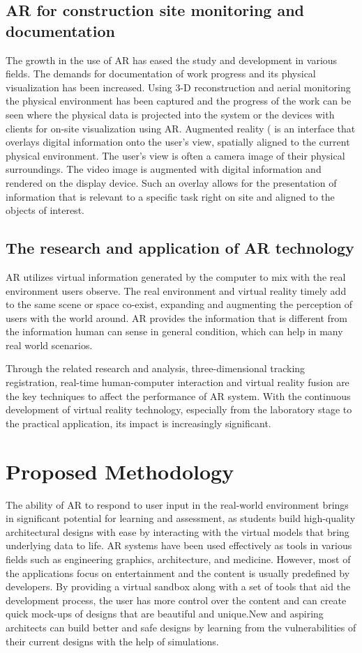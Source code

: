\documentclass[conference]{IEEEtran}
\begin{document}
\subsection{AR for construction site monitoring and documentation}
The growth in the use of AR has eased the study and development in various fields. The demands for documentation of work progress and its physical visualization has been increased. Using 3-D reconstruction and aerial monitoring the physical environment has been captured and the progress of the work can be seen where the physical data is projected into the system or the devices with clients for on-site visualization using AR\cite{sitemonitoring}. Augmented reality ( is an interface that overlays digital information onto the user's view, spatially aligned to the current physical environment. The user's view is often a camera image of their physical surroundings. The video image is augmented with digital information and rendered on the display device. Such an overlay allows for the presentation of information that is relevant to a specific task right on site and aligned to the objects of interest.
\subsection{The research and application of AR technology}
AR utilizes virtual information generated by the computer to mix with the real environment users observe. The real environment and virtual reality timely add to the same scene or space co-exist, expanding and augmenting the perception of users with the world around. AR provides the information  that is different from the information human can sense in general condition, which can help in many real world scenarios.

Through the related research and analysis, three-dimensional tracking registration, real-time human-computer interaction and virtual reality fusion are the key techniques to affect the performance of AR system\cite{researchar}. With the continuous development of virtual reality technology, especially from the laboratory stage to the practical application, its impact is increasingly significant.
\section{Proposed Methodology}
The ability of AR to respond to user input in the real-world environment brings in significant potential for learning and assessment, as students build high-quality architectural designs with ease by interacting with the virtual models that bring underlying data to life. AR systems have been used effectively as tools in various fields such as engineering graphics, architecture, and medicine. However, most of the applications focus on entertainment and the content is usually predefined by developers. By providing a virtual sandbox along with a set of tools that aid the development process, the user has more control over the content and can create quick mock-ups of designs that are beautiful and unique.New and aspiring architects can build better and safe designs by learning from the vulnerabilities of their current designs with the help of simulations.
\end{document}
